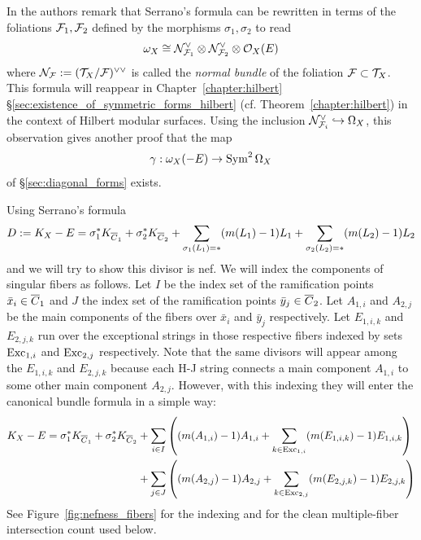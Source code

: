 \documentclass[main.tex]{subfiles}
\begin{document}
In \cite{lang_product_quotient} the authors remark that Serrano's formula can be rewritten in terms of the foliations $\mathcal{F}_1, \mathcal{F}_2$ defined by the morphisms $\sigma_1, \sigma_2$ to read
\[ \omega_X \cong \mathcal{N}_{\mathcal{F}_1}^{\vee} \otimes \mathcal{N}_{\mathcal{F}_2}^{\vee} \otimes \mathcal{O}_X(E) \]
where $\mathcal{N}_{\mathcal{F}} := (\mathcal{T}_X / \mathcal{F})^{\vee \vee}$ is called the \textit{normal bundle} of the foliation $\mathcal{F} \subset \mathcal{T}_X$.
This formula will reappear in Chapter~\ref{chapter:hilbert} \S\ref{sec:existence_of_symmetric_forms_hilbert} (cf. Theorem~\ref{chapter:hilbert}) in the context of Hilbert modular surfaces. Using the inclusion $\mathcal{N}_{\mathcal{F}_i}^{\vee} \hookrightarrow \Omega_X$, this observation gives another proof that the map 
\[ \gamma : \omega_X(-E) \to \operatorname{\mathrm{Sym}}^2 \Omega_X \]
of \S\ref{sec:diagonal_forms} exists. 
\par 
Using Serrano's formula
\[ D := K_X - E = \sigma_1^* K_{\overline{C}_1} + \sigma_2^* K_{\overline{C}_2} + \sum_{\sigma_1(L_1) = *} (m(L_1) - 1) L_1 + \sum_{\sigma_2(L_2) = *} (m(L_2) - 1) L_2 \]
and we will try to show this divisor is nef. We will index the components of singular fibers as follows. Let $I$ be the index set of the ramification points $\bar{x}_i \in \overline{C}_1$ and $J$ the index set of the ramification points $\bar{y}_j \in \overline{C}_2$. Let $A_{1,i}$ and $A_{2,j}$ be the main components of the fibers over $\bar{x}_i$ and $\bar{y}_j$ respectively. Let $E_{1,i,k}$ and $E_{2,j,k}$ run over the exceptional strings in those respective fibers indexed by sets $\operatorname{\mathrm{Exc}}_{1,i}$ and $\operatorname{\mathrm{Exc}}_{2,j}$ respectively. Note that the same divisors will appear among the $E_{1,i,k}$ and $E_{2,j,k}$ because each H-J string connects a main component $A_{1,i}$ to some other main component $A_{2,j}$. However, with this indexing they will enter the canonical bundle formula in a simple way:
\begin{align*}
K_X - E = \sigma_1^* K_{\overline{C}_1} + \sigma_2^* K_{\overline{C}_2}  & + \sum_{i \in I} \left( (m(A_{1,i}) - 1) A_{1,i} + \sum_{k \in \operatorname{\mathrm{Exc}}_{1,i}} (m(E_{1,i,k}) - 1) E_{1,i,k} \right)
\\
& + \sum_{j \in J} \left( (m(A_{2,j}) - 1) A_{2,j} + \sum_{k \in \operatorname{\mathrm{Exc}}_{2,j}} (m(E_{2,j,k}) - 1) E_{2,j,k} \right)
\end{align*}
See Figure~\ref{fig:nefness_fibers} for the indexing and for the clean multiple-fiber intersection count used below.
\end{document}
